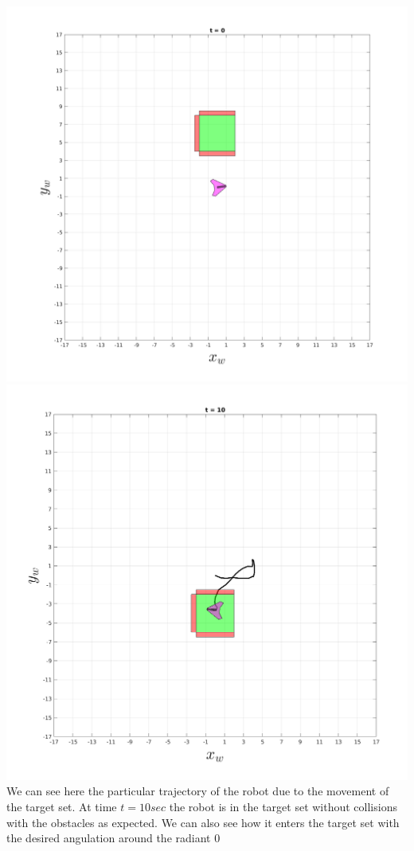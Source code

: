     \includegraphics[scale=0.25]{figures/dynamicTRAJ1.png}
    \includegraphics[scale=0.25]{figures/dynamicTRAJ2.png}
    \\
    We can see here the particular trajectory of the robot due to the movement of the target set. At time $t=10sec$ the robot is in the target set without collisions with the obstacles as expected. We can also see how it enters the target set with the desired angulation around the radiant 0
